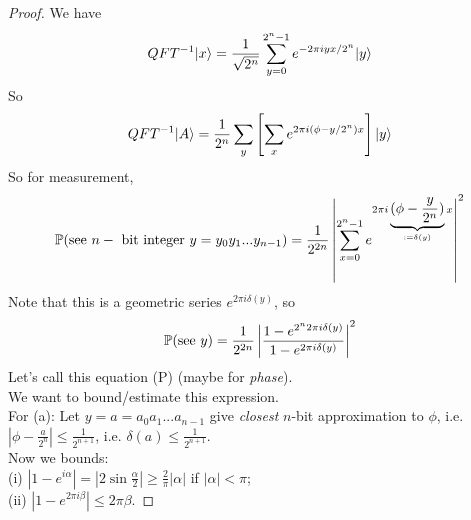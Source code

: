 \documentclass[a4paper]{article}
\begin{document}
\begin{thm}
    \begin{proof}
        We have
        \begin{equation*}
            \begin{aligned}
                QFT^{-1}|x\ket = \frac{1}{\sqrt{2^n}} \sum_{y=0}^{2^n-1} e^{-2\pi i yx / 2^n} |y\ket
            \end{aligned}
        \end{equation*}
        So
        \begin{equation*}
            \begin{aligned}
                QFT^{-1} |A\ket =\frac{1}{2^n} \sum_y \left[\sum_x e^{2\pi i(\phi - y/2^n)x}\right] |y\ket
            \end{aligned}
        \end{equation*}
        So for measurement,
        \begin{equation*}
            \begin{aligned}
                \P(\text{see } n- \text{ bit integer } y=y_0y_1...y_{n-1}) = \frac{1}{2^{2n}} \left|\sum_{x=0}^{2^n-1} e^{2\pi i \underbrace{(\phi-\frac{y}{2^n})}_{:=\delta(y)} x}\right|^2
            \end{aligned}
        \end{equation*}
        Note that this is a geometric series $e^{2\pi i \delta(y)}$, so 
        \begin{equation*}
            \begin{aligned}
                \P(\text{see } y) = \frac{1}{2^{2n}} \left|\frac{1-e^{2^n 2\pi i \delta(y)}}{1-e^{2\pi i\delta(y)}} \right|^2
            \end{aligned}
        \end{equation*}
        Let's call this equation (P) (maybe for \emph{phase}).\\
        We want to bound/estimate this expression.\\
        For (a): Let $y=a=a_0a_1...a_{n-1}$ give \emph{closest} $n$-bit approximation to $\phi$, i.e. $|\phi-\frac{a}{2^n}| \leq \frac{1}{2^{n+1}}$, i.e. $\delta(a) \leq \frac{1}{2^{n+1}}$.\\
        Now we bounds:\\
        (i) $|1-e^{i\alpha}| = |2\sin \frac{\alpha}{2}| \geq \frac{2}{\pi} |\alpha|$ if $|\alpha| < \pi$;\\
        (ii) $|1 - e^{2\pi i \beta}| \leq 2\pi \beta$.


\end{proof}
\end{thm}
\end{document}
